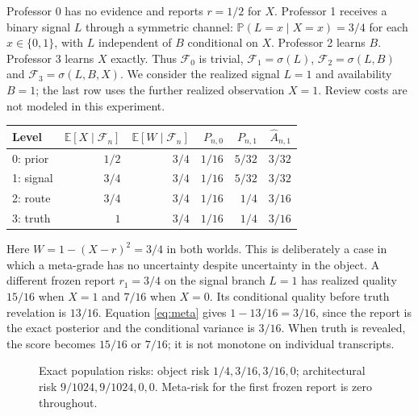 \documentclass[11pt]{article}
\newcommand{\E}{\mathbb E}\newcommand{\Prob}{\mathbb P}\newcommand{\F}{\mathcal F}\newcommand{\N}{\mathbb N}\newcommand{\Var}{\operatorname{Var}}\newcommand{\one}{\mathbf 1}\newcommand{\spp}{\mathrm{SPP}}
\begin{document}
Professor 0 has no evidence and reports $r=1/2$ for $X$. Professor 1 receives a binary signal $L$ through a symmetric channel: $\Prob(L=x\mid X=x)=3/4$ for each $x\in\{0,1\}$, with $L$ independent of $B$ conditional on $X$. Professor 2 learns $B$. Professor 3 learns $X$ exactly. Thus $\F_0$ is trivial, $\F_1=\sigma(L)$, $\F_2=\sigma(L,B)$ and $\F_3=\sigma(L,B,X)$. We consider the realized signal $L=1$ and availability $B=1$; the last row uses the further realized observation $X=1$. Review costs are not modeled in this experiment.

\begin{center}\small
\begin{tabular}{@{}lrrrrr@{}}
\toprule
Level & $\E[X\mid\F_n]$ & $\E[W\mid\F_n]$ & $P_{n,0}$ & $P_{n,1}$ & $\widehat A_{n,1}$\\
\midrule
0: prior & $1/2$ & $3/4$ & $1/16$ & $5/32$ & $3/32$\\
1: signal & $3/4$ & $3/4$ & $1/16$ & $5/32$ & $3/32$\\
2: route & $3/4$ & $3/4$ & $1/16$ & $1/4$ & $3/16$\\
3: truth & $1$ & $3/4$ & $1/16$ & $1/4$ & $3/16$\\
\bottomrule
\end{tabular}
\end{center}
Here $W=1-(X-r)^2=3/4$ in both worlds. This is deliberately a case in which a meta-grade has no uncertainty despite uncertainty in the object. A different frozen report $r_1=3/4$ on the signal branch $L=1$ has realized quality $15/16$ when $X=1$ and $7/16$ when $X=0$. Its conditional quality before truth revelation is $13/16$. Equation \eqref{eq:meta} gives $1-13/16=3/16$, since the report is the exact posterior and the conditional variance is $3/16$. When truth is revealed, the score becomes $15/16$ or $7/16$; it is not monotone on individual transcripts.

\begin{figure}[ht]
\centering
{}
\caption{Exact population risks: object risk $1/4,3/16,3/16,0$; architectural risk $9/1024,9/1024,0,0$. Meta-risk for the first frozen report is zero throughout.}
\end{figure}
\end{document}
